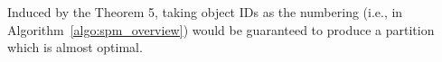 Induced by the Theorem 5, taking object IDs as the numbering (i.e., in Algorithm~\ref{algo:spm_overview})
would be guaranteed to produce a partition which is almost optimal.
%
%

